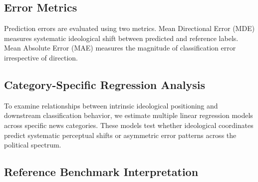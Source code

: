 \documentclass[11pt]{article}
\begin{document}

\subsection{Error Metrics}

Prediction errors are evaluated using two metrics. Mean Directional Error (MDE) measures systematic ideological shift between predicted and reference labels. Mean Absolute Error (MAE) measures the magnitude of classification error irrespective of direction.

\subsection{Category-Specific Regression Analysis}

To examine relationships between intrinsic ideological positioning and downstream classification behavior, we estimate multiple linear regression models across specific news categories. These models test whether ideological coordinates predict systematic perceptual shifts or asymmetric error patterns across the political spectrum.

\subsection{Reference Benchmark Interpretation}
\end{document}
